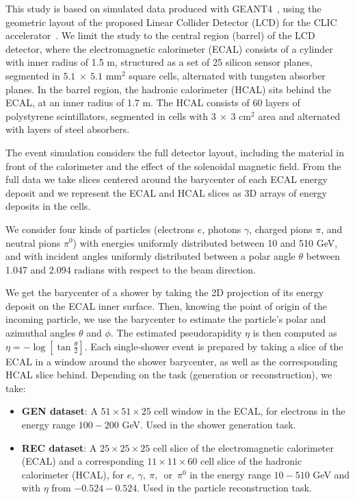 This study is based on simulated data produced with GEANT4~\cite{GEANT4}, using the geometric layout of the proposed Linear Collider Detector (LCD) for the CLIC accelerator~\cite{Lebrun:2012hj}. We limit the study to the central region (barrel) of the LCD detector, where the electromagnetic calorimeter (ECAL) consists of a cylinder with inner radius of 1.5 m, structured as a set of 25 silicon sensor planes, segmented in $5.1~\times~5.1$ mm$^2$ square cells, alternated with tungsten absorber planes. In the barrel region, the hadronic calorimeter (HCAL) sits behind the ECAL, at an inner radius of 1.7 m. The HCAL 
consists of 60 layers of polystyrene scintillators, segmented in cells with  $3~\times~3$ cm$^2$ area and alternated with layers of steel absorbers. 

The event simulation considers the full detector layout, including the material in front of the calorimeter and the effect of the solenoidal magnetic field. From the full data we take slices centered around the barycenter of each ECAL energy deposit and we represent the ECAL and HCAL slices as 3D arrays of energy deposits in the cells. 

We consider four kinds of particles (electrons $e$, photons $\gamma$, charged pions $\pi$, and neutral pions $\pi^0$) with energies uniformly distributed between 10 and 510 GeV, and with incident angles uniformly distributed between a polar angle $\theta$ between 1.047 and 2.094 radians with respect to the beam direction.

We get the barycenter of a shower by taking the 2D projection of its energy deposit on the ECAL inner surface. Then, knowing the point of origin of the incoming particle, we use the barycenter to estimate the particle's polar and azimuthal angles $\theta$ and $\phi$. The estimated pseudorapidity $\eta$ is then computed as $\eta=-\log[\tan\frac{\theta}{2}]$. Each single-shower event is prepared by taking a slice of the ECAL in a window around the shower barycenter, as well as the corresponding HCAL slice behind. Depending on the task (generation or reconstruction), we take:
\begin{itemize}
  \item {\bf GEN dataset}: A $51 \times 51 \times 25$ cell window in the
    ECAL, for electrons in the energy range $100-200$ GeV. Used in the shower generation task.
  \item {\bf REC dataset}: A $25 \times
    25 \times 25$ cell slice of the electromagnetic calorimeter (ECAL)
    and a corresponding $11 \times 11 \times 60$ cell slice of the
    hadronic calorimeter (HCAL), for $e,~\gamma,~\pi,$~or~$\pi^0$ in the energy range $10-510$ GeV and with $\eta$ from $-0.524-0.524$. Used in the particle reconstruction task.
\end{itemize}

